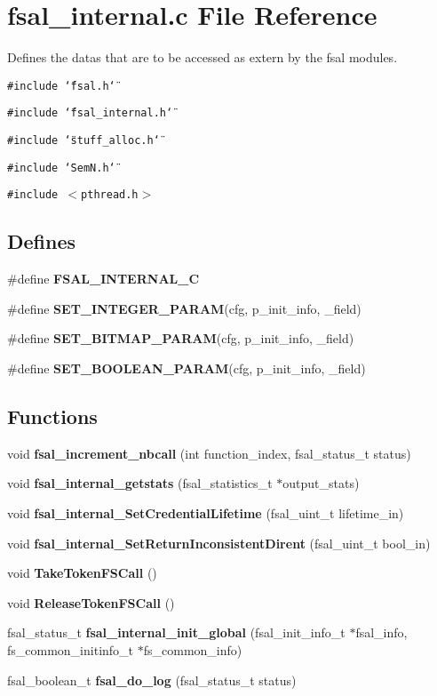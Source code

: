 \section{fsal\_\-internal.c File Reference}
\label{fsal__internal_8c}
Defines the datas that are to be accessed as extern by the fsal modules. 

{\tt \#include \char`\"{}fsal.h\char`\"{}}\par
{\tt \#include \char`\"{}fsal\_\-internal.h\char`\"{}}\par
{\tt \#include \char`\"{}stuff\_\-alloc.h\char`\"{}}\par
{\tt \#include \char`\"{}Sem\-N.h\char`\"{}}\par
{\tt \#include $<$pthread.h$>$}\par
\subsection*{Defines}
\begin{CompactItemize}
\item 
\#define {\bf FSAL\_\-INTERNAL\_\-C}\label{fsal__internal_8c_a0}

\item 
\#define {\bf SET\_\-INTEGER\_\-PARAM}(cfg, p\_\-init\_\-info, \_\-field)
\item 
\#define {\bf SET\_\-BITMAP\_\-PARAM}(cfg, p\_\-init\_\-info, \_\-field)
\item 
\#define {\bf SET\_\-BOOLEAN\_\-PARAM}(cfg, p\_\-init\_\-info, \_\-field)
\end{CompactItemize}
\subsection*{Functions}
\begin{CompactItemize}
\item 
void {\bf fsal\_\-increment\_\-nbcall} (int function\_\-index, fsal\_\-status\_\-t status)
\item 
void {\bf fsal\_\-internal\_\-getstats} (fsal\_\-statistics\_\-t $\ast$output\_\-stats)
\item 
void {\bf fsal\_\-internal\_\-Set\-Credential\-Lifetime} (fsal\_\-uint\_\-t lifetime\_\-in)
\item 
void {\bf fsal\_\-internal\_\-Set\-Return\-Inconsistent\-Dirent} (fsal\_\-uint\_\-t bool\_\-in)
\item 
void {\bf Take\-Token\-FSCall} ()
\item 
void {\bf Release\-Token\-FSCall} ()\label{fsal__internal_8c_a19}

\item 
fsal\_\-status\_\-t {\bf fsal\_\-internal\_\-init\_\-global} (fsal\_\-init\_\-info\_\-t $\ast$fsal\_\-info, fs\_\-common\_\-initinfo\_\-t $\ast$fs\_\-common\_\-info)\label{fsal__internal_8c_a20}

\item 
fsal\_\-boolean\_\-t {\bf fsal\_\-do\_\-log} (fsal\_\-status\_\-t status)
\end{CompactItemize}
